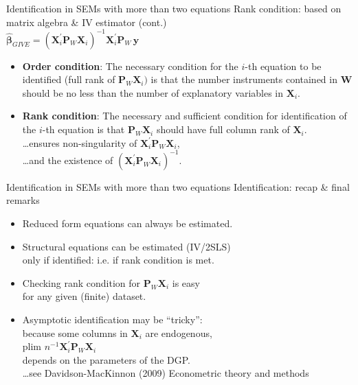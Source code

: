 \documentclass[usenames,dvipsnames]{beamer}
\begin{document}
\begin{frame}{Identification in SEMs with more than two equations}
Rank condition: based on matrix algebra \& IV estimator (cont.)\\
\medskip
$\hat{\bm\beta}_{\textit{GIVE}}=
\left(\bm{X}^{\prime}_i \bm{P}_W \bm{X}_i\right)^{-1}\! \bm{X}^{\prime}_i \bm{P}_W \, \bm{y}$\\
\bigskip
\begin{itemize}
\item \textbf{Order condition}: The necessary condition for the $i$-th equation to be identified (full rank of $\bm{P}_W\bm{X}_i)$ is that the number instruments contained in $\bm{W}$ should be no less than the number of explanatory variables in $\bm{X}_i$.\\
\medskip
\item \textbf{Rank condition}: The necessary and sufficient condition for identification of the $i$-th equation is that $\bm{P}_W\bm{X}_i$ should have full column rank of $\bm{X}_i$.\\
\dots ensures non-singularity of  $\bm{X}^{\prime}_i \bm{P}_W \bm{X}_i$,\\
\dots and the existence of $\left(\bm{X}^{\prime}_i \bm{P}_W \bm{X}_i\right)^{-1}$.
\end{itemize}
\end{frame}
\begin{frame}{Identification in SEMs with more than two equations}
Identification: recap \& final remarks\\
\bigskip
\begin{itemize}
\item Reduced form equations can always be estimated.\\
\smallskip
\item Structural equations can be estimated (IV/2SLS) \\only if identified: i.e. if rank condition is met.\\
\bigskip
\item Checking rank condition for $\bm{P}_W\bm{X}_i$ is easy \\for any given (finite) dataset.\\
\smallskip
\item Asymptotic identification may be ``tricky'': \\because some columns in $\bm{X}_i$ are endogenous,\\
\smallskip
plim $n^{-1} \bm{X}^{\prime}_i \bm{P}_W \bm{X}_i$ ~~ \\
\smallskip 
depends on the parameters of the DGP.\\
\medskip
\footnotesize{\dots see Davidson-MacKinnon (2009) Econometric theory and methods}
\end{itemize}
\end{frame}
\end{document}
